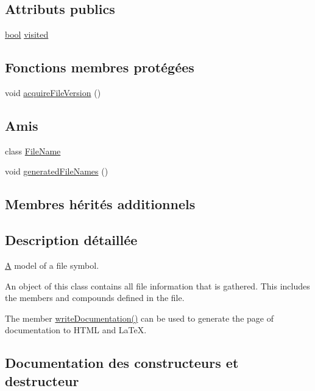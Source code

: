 \subsection*{Attributs publics}
\begin{DoxyCompactItemize}
\item 
\hyperlink{qglobal_8h_a1062901a7428fdd9c7f180f5e01ea056}{bool} \hyperlink{class_file_def_ad5dd0c1f9f0df9b7f36abf6feea9c1a1}{visited}
\end{DoxyCompactItemize}
\subsection*{Fonctions membres protégées}
\begin{DoxyCompactItemize}
\item 
void \hyperlink{class_file_def_a5f297c95a2f5b8d2e1a7e3620b4c8d01}{acquire\+File\+Version} ()
\end{DoxyCompactItemize}
\subsection*{Amis}
\begin{DoxyCompactItemize}
\item 
class \hyperlink{class_file_def_a5038284eb3ca46435712b365a038056a}{File\+Name}
\item 
void \hyperlink{class_file_def_a35cc830de6fcd806519b598217001e5a}{generated\+File\+Names} ()
\end{DoxyCompactItemize}
\subsection*{Membres hérités additionnels}


\subsection{Description détaillée}
\hyperlink{class_a}{A} model of a file symbol.

An object of this class contains all file information that is gathered. This includes the members and compounds defined in the file.

The member \hyperlink{class_file_def_a7a73cf8448a6995be00369858d4768e8}{write\+Documentation()} can be used to generate the page of documentation to H\+T\+M\+L and La\+Te\+X. 

\subsection{Documentation des constructeurs et destructeur}
\hypertarget{class_file_def_aa0f1d4c412599b7c03d214c939e1ca95}{}

